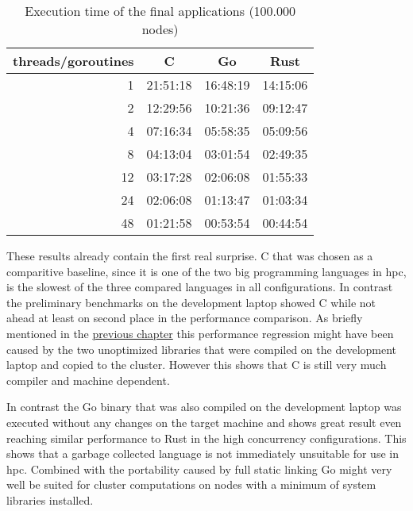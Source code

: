 \begin{table}[htb]
    \centering
    \begin{tabular}{rccc}
        \toprule
            threads/goroutines
            & C
            & Go
            & Rust \\
        \midrule

            1
            & 21:51:18
            & 16:48:19
            & 14:15:06 \\

            2
            & 12:29:56
            & 10:21:36
            & 09:12:47 \\

            4
            & 07:16:34
            & 05:58:35
            & 05:09:56 \\

            8
            & 04:13:04
            & 03:01:54
            & 02:49:35 \\

            12
            & 03:17:28
            & 02:06:08
            & 01:55:33 \\

            24
            & 02:06:08
            & 01:13:47
            & 01:03:34 \\

            48
            & 01:21:58
            & 00:53:54
            & 00:44:54 \\

        \bottomrule
    \end{tabular}
    \caption{Execution time of the final applications (100.000 nodes)}
    \label{tb:final_execution_time}
\end{table}

These results already contain the first real surprise. C that was chosen as a comparitive baseline, since it is one of the two big programming languages in \gls{hpc}, is the slowest of the three compared languages in all configurations. In contrast the preliminary benchmarks on the development laptop showed C while not ahead at least on second place in the performance comparison. As briefly mentioned in the \hyperref[subsec:Implementation::ClusterPreparation::C]{previous chapter} this performance regression might have been caused by the two unoptimized libraries that were compiled on the development laptop and copied to the cluster. However this shows that C is still very much compiler and machine dependent.

In contrast the Go binary that was also compiled on the development laptop was executed without any changes on the target machine and shows great result even reaching similar performance to Rust in the high concurrency configurations. This shows that a garbage collected language is not immediately unsuitable for use in \gls{hpc}. Combined with the portability caused by full static linking Go might very well be suited for cluster computations on nodes with a minimum of system libraries installed.

